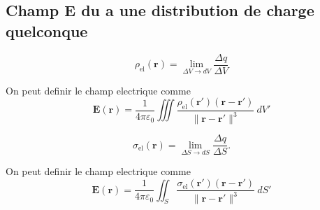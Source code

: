 \subsection{Champ \texorpdfstring{$\boldsymbol{E}$}{electrique} du a une distribution de charge quelconque}

\begin{definition} 
$$
\rho _{\mathrm{el}}(\boldsymbol{r})=\lim_{ \Delta V \to dV } \frac{\Delta q}{\Delta V}
$$
\end{definition}
On peut definir le champ electrique comme
$$
\boldsymbol{E}(\boldsymbol{r})=\frac{1}{4\pi\varepsilon _{0}} \iiint \frac{\rho _{\mathrm{el}}(\boldsymbol{r}')(\boldsymbol{r}-\boldsymbol{r}')}{\lVert \boldsymbol{r}-\boldsymbol{r}' \rVert^{3} }~dV'
$$
\begin{definition}
$$
\sigma _{\mathrm{el}}(\boldsymbol{r})=\lim_{ \Delta S \to dS } \frac{\Delta q}{\Delta S}.
$$
\end{definition}
On peut definir le champ electrique comme
$$
\boldsymbol{E}(\boldsymbol{r})=\frac{1}{4\pi\varepsilon_{0}}\iint _{S} \frac{\sigma _{\mathrm{el}}(\boldsymbol{r}')(\boldsymbol{r}-\boldsymbol{r}')}{\lVert \boldsymbol{r}-\boldsymbol{r}' \rVert ^{3}}~dS'
$$
